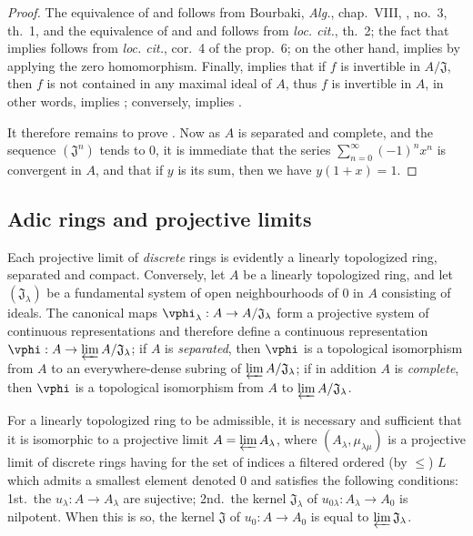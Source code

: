 \begin{proof}
The equivalence of  and 
follows from Bourbaki, \emph{Alg.}, chap.~VIII, , no.~3,
th.~1, and the equivalence of  and
 and  follows from
\emph{loc. cit.}, th.~2; the fact that  implies
 follows from \emph{loc. cit.},
cor.~4 of the prop.~6; on the other hand,  implies
 by applying the zero homomorphism. Finally,
 implies that if $f$ is invertible in $A/\mathfrak{J}$,
then $f$ is not contained in any maximal ideal of $A$, thus $f$ is invertible in $A$,
in other words,  implies ;
conversely,  implies .

It therefore remains to prove . Now as $A$ is separated and
complete, and the sequence $(\mathfrak{J}^n)$ tends to $0$, it is immediate that
the series $\sum_{n=0}^\infty(-1)^n x^n$ is convergent in $A$, and that if $y$
is its sum, then we have $y(1+x)=1$.
\end{proof}

\subsection{Adic rings and projective limits}
\label{subsection:0.7.2}

\begin{env}[7.2.1]
\label{0.7.2.1}
Each projective limit of \emph{discrete} rings is evidently a linearly
topologized ring, separated and compact. Conversely, let $A$ be a linearly
topologized ring, and let $(\mathfrak{J}_\lambda)$ be a fundamental system of
open neighbourhoods of $0$ in $A$ consisting of
ideals. The canonical maps $\vphi_\lambda:A\to A/\mathfrak{J}_\lambda$ form
a projective system of continuous representations and therefore define a
continuous representation $\vphi:A\to\varprojlim A/\mathfrak{J}_\lambda$; if $A$
is \emph{separated}, then $\vphi$ is a topological isomorphism from $A$ to an
everywhere-dense subring of $\varprojlim A/\mathfrak{J}_\lambda$; if in
addition $A$ is \emph{complete}, then $\vphi$ is a topological isomorphism from
$A$ to $\varprojlim A/\mathfrak{J}_\lambda$.
\end{env}

\begin{lemma}[7.2.2]
\label{0.7.2.2}
For a linearly topologized ring to be admissible, it is necessary and sufficient
that it is isomorphic to a projective limit $A=\varprojlim A_\lambda$, where
$(A_\lambda,\mu_{\lambda\mu})$ is a projective limit of discrete rings having
for the set of indices a filtered ordered (by $\leq$) $L$ which admits
a smallest element denoted $0$ and satisfies the following conditions:
1st.~the $u_\lambda:A\to A_\lambda$ are sujective;
2nd.~the kernel $\mathfrak{J}_\lambda$ of
$u_{0\lambda}:A_\lambda\to A_0$ is nilpotent. When this is so, the kernel
$\mathfrak{J}$ of $u_0:A\to A_0$ is equal to $\varprojlim\mathfrak{J}_\lambda$.
\end{lemma}

